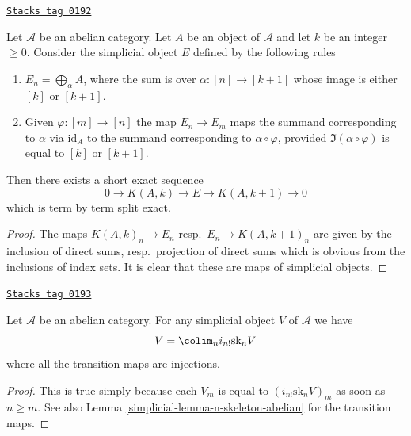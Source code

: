\begin{lemma}[Extension]
\label{simplicial-lemma-extension}
\href{https://stacks.math.columbia.edu/tag/0192}{\texttt{Stacks tag 0192}}

Let $\mathcal{A}$ be an abelian category.
Let $A$ be an object of $\mathcal{A}$ and
let $k$ be an integer $\geq 0$. Consider the
simplicial object $E$ defined by the following rules
\begin{enumerate}
\item $E_n = \bigoplus_\alpha A$, where the
sum is over $\alpha : [n] \to [k + 1]$ whose
image is either $[k]$ or $[k + 1]$.
\item Given $\varphi : [m] \to [n]$ the map
$E_n \to E_m$ maps the summand corresponding
to $\alpha$ via $\text{id}_A$ to the summand
corresponding to $\alpha \circ \varphi$,
provided $\Im(\alpha \circ \varphi)$
is equal to $[k]$ or $[k + 1]$.
\end{enumerate}
Then there exists a short exact sequence
$$
0 \to K(A, k) \to E \to K(A, k + 1) \to 0
$$
which is term by term split exact.
\end{lemma}

\begin{proof}
The maps $K(A, k)_n \to E_n$ resp.\ $E_n \to K(A, k + 1)_n$
are given by the inclusion of direct sums, resp.\ projection
of direct sums which is obvious from the inclusions of index
sets. It is clear that these are maps of simplicial
objects.
\end{proof}

\begin{lemma}
\label{simplicial-lemma-abelian-limit-skeleta}
\href{https://stacks.math.columbia.edu/tag/0193}{\texttt{Stacks tag 0193}}

Let $\mathcal{A}$ be an abelian category.
For any simplicial object $V$ of $\mathcal{A}$ we have
$$
V = \colim_n i_{n!}\text{sk}_n V
$$
where all the transition maps are injections.
\end{lemma}

\begin{proof}

This is true simply because each $V_m$ is
equal to $(i_{n!}\text{sk}_n V)_m$ as
soon as $n \geq m$. See also Lemma \ref{simplicial-lemma-n-skeleton-abelian}
for the transition maps.
\end{proof}

